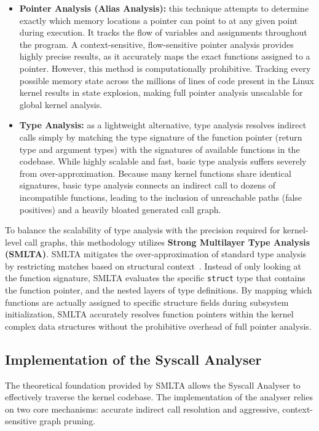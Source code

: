\begin{itemize}
    \item \textbf{Pointer Analysis (Alias Analysis):} this technique attempts to determine exactly which memory locations a pointer can point to at any given point during execution. It tracks the flow of variables and assignments throughout the program. A context-sensitive, flow-sensitive pointer analysis provides highly precise results, as it accurately maps the exact functions assigned to a pointer. However, this method is computationally prohibitive. Tracking every possible memory state across the millions of lines of code present in the Linux kernel results in state explosion, making full pointer analysis unscalable for global kernel analysis.
    
    \item \textbf{Type Analysis:} as a lightweight alternative, type analysis resolves indirect calls simply by matching the type signature of the function pointer (return type and argument types) with the signatures of available functions in the codebase. While highly scalable and fast, basic type analysis suffers severely from over-approximation. Because many kernel functions share identical signatures, basic type analysis connects an indirect call to dozens of incompatible functions, leading to the inclusion of unreachable paths (false positives) and a heavily bloated generated call graph.
\end{itemize}

To balance the scalability of type analysis with the precision required for kernel-level call graphs, this methodology utilizes \textbf{Strong Multilayer Type Analysis (SMLTA)}.
SMLTA mitigates the over-approximation of standard type analysis by restricting matches based on structural context~\cite{smlta}.
Instead of only looking at the function signature, SMLTA evaluates the specific \texttt{struct} type that contains the function pointer, and the nested layers of type definitions.
By mapping which functions are actually assigned to specific structure fields during subsystem initialization, SMLTA accurately resolves function pointers within the kernel complex data structures without the prohibitive overhead of full pointer analysis.

\subsection{Implementation of the Syscall Analyser}

The theoretical foundation provided by SMLTA allows the Syscall Analyser to effectively traverse the kernel codebase.
The implementation of the analyser relies on two core mechanisms: accurate indirect call resolution and aggressive, context-sensitive graph pruning.

